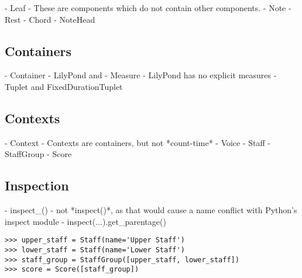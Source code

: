 \begin{markdown}
-   Leaf
-   These are components which do not contain other components.
-   Note
-   Rest
-   Chord
-   NoteHead
\end{markdown}

\subsection{Containers}

\begin{markdown}
-   Container
-   LilyPond and { }
-   Measure
-   LilyPond has no explicit measures
-   Tuplet and FixedDurationTuplet
\end{markdown}

\subsection{Contexts}

\begin{markdown}
-   Context
-   Contexts are containers, but not *count-time*
-   Voice
-   Staff
-   StaffGroup
-   Score
\end{markdown}

\subsection{Inspection}

\begin{markdown}
-   inspect_()
-   not *inspect()*, as that would cause a name conflict with Python's inspect
    module
-   inspect(...).get_parentage()
\end{markdown}

\begin{comment}
<abjad>
upper_staff = Staff(name='Upper Staff')
lower_staff = Staff(name='Lower Staff')
staff_group = StaffGroup([upper_staff, lower_staff])
score = Score([staff_group])
</abjad>
\end{comment}

\begin{singlespacing}
\vspace{-0.5\baselineskip}
\begin{lstlisting}
>>> upper_staff = Staff(name='Upper Staff')
>>> lower_staff = Staff(name='Lower Staff')
>>> staff_group = StaffGroup([upper_staff, lower_staff])
>>> score = Score([staff_group])
\end{lstlisting}
\end{singlespacing}

